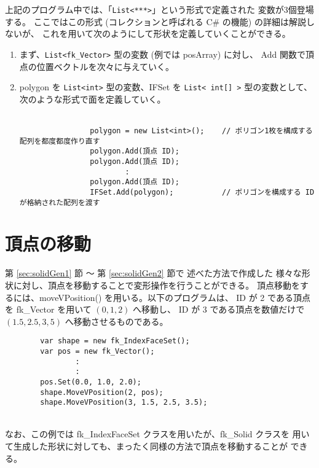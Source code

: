 上記のプログラム中では、「\verb+List<***>+」という形式で定義された
変数が3個登場する。
ここではこの形式 (コレクションと呼ばれる C\# の機能) の詳細は解説しないが、
これを用いて次のようにして形状を定義していくことができる。
\begin{enumerate}
 \item まず、\verb+List<fk_Vector>+ 型の変数 (例では posArray) に対し、
	Add 関数で頂点の位置ベクトルを次々に与えていく。

 \item polygon を \verb+List<int>+ 型の変数、IFSet を
	\verb+List< int[] >+ 型の変数として、
	次のような形式で面を定義していく。\\ ~ \\
	\begin{screen}
	\begin{verbatim}
                polygon = new List<int>();    // ポリゴン1枚を構成する配列を都度都度作り直す
                polygon.Add(頂点 ID);
                polygon.Add(頂点 ID);
                        :
                polygon.Add(頂点 ID);
                IFSet.Add(polygon);           // ポリゴンを構成する ID が格納された配列を渡す
	\end{verbatim}
	\end{screen}
\end{enumerate}

\section{頂点の移動} \label{sec:movevertex}
第 \ref{sec:solidGen1} 節 〜 第 \ref{sec:solidGen2} 節で
述べた方法で作成した
様々な形状に対し、頂点を移動することで変形操作を行うことができる。
頂点移動をするには、moveVPosition() を用いる。以下のプログラムは、
ID が 2 である頂点を fk\_Vector を用いて \((0, 1, 2)\) へ移動し、
ID が 3 である頂点を数値だけで \((1.5, 2.5, 3,5)\) へ移動させるものである。
\\
\begin{breakbox}
\begin{verbatim}
        var shape = new fk_IndexFaceSet();
        var pos = new fk_Vector();
                :
                :
        pos.Set(0.0, 1.0, 2.0);
        shape.MoveVPosition(2, pos);
        shape.MoveVPosition(3, 1.5, 2.5, 3.5);
\end{verbatim}
\end{breakbox}
~ \\
なお、この例では fk\_IndexFaceSet クラスを用いたが、fk\_Solid クラスを
用いて生成した形状に対しても、まったく同様の方法で頂点を移動することが
できる。

